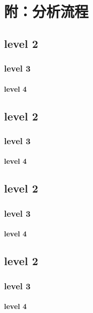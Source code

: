 \documentclass[
]{article}
\begin{document}
\hypertarget{workflow}{%
\section{附：分析流程}\label{workflow}}

\hypertarget{level-2}{%
\subsection{level 2}\label{level-2}}

\hypertarget{level-3}{%
\subsubsection{level 3}\label{level-3}}

\hypertarget{level-4}{%
\paragraph{level 4}\label{level-4}}

\hypertarget{level-2-1}{%
\subsection{level 2}\label{level-2-1}}

\hypertarget{level-3-1}{%
\subsubsection{level 3}\label{level-3-1}}

\hypertarget{level-4-1}{%
\paragraph{level 4}\label{level-4-1}}

\hypertarget{level-2-2}{%
\subsection{level 2}\label{level-2-2}}

\hypertarget{level-3-2}{%
\subsubsection{level 3}\label{level-3-2}}

\hypertarget{level-4-2}{%
\paragraph{level 4}\label{level-4-2}}

\hypertarget{level-2-3}{%
\subsection{level 2}\label{level-2-3}}

\hypertarget{level-3-3}{%
\subsubsection{level 3}\label{level-3-3}}

\hypertarget{level-4-3}{%
\paragraph{level 4}\label{level-4-3}}
\end{document}
